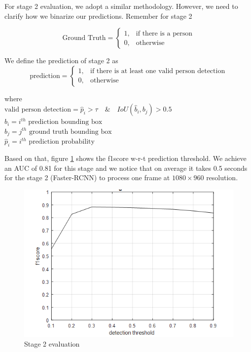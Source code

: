 For stage 2 evaluation, we adopt a similar methodology. However, we need to clarify how we binarize our predictions. Remember for stage 2

$$
\text{Ground Truth} = 
\begin{cases}
1, &    \text{if there is a person} \\
0, &    \text{otherwise}
\end{cases}
$$

We define the prediction of stage 2 as 
$$
\text{prediction} = 
\begin{cases}
1, &    \text{if there is at least one valid person detection} \\
0, &    \text{otherwise}
\end{cases}
$$

where \\
$\text{valid person detection} = \hat{p}_i>\tau \quad \& \quad IoU(\hat{b}_i,b_j)>0.5$ \\
$\hat{b}_i =i^{th} \text{ prediction bounding box}$ \\
$b_j =j^{th} \text{ ground truth bounding box}$ \\
$\hat{p}_i = i^{th} \text{ prediction probability}$

Based on that, figure \ref{fig:f1-analysis-s2} shows the f1score w-r-t prediction threshold. We achieve an AUC of 0.81 for this stage and we notice that on average it takes 0.5 seconds for the stage 2 (Faster-RCNN) to process one frame at $1080 \times 960$ resolution. 

\begin{figure}
    \centering
    \includegraphics[width=\linewidth]{images/f1-analysis-s2.png}
    \caption{Stage 2 evaluation}
    \label{fig:f1-analysis-s2}
\end{figure}

